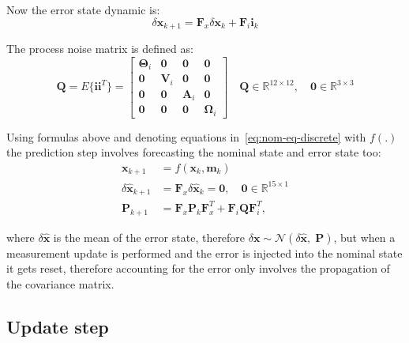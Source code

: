 Now the error state dynamic is:
\begin{equation}
    \delta\mathbf{x}_{k+1}=\mathbf{F}_x\delta\mathbf{x}_k+\mathbf{F}_{i}\mathbf{i}_k
    \label{eq:error-state-dyn}
\end{equation}

The process noise matrix is defined as:
\begin{equation}
    \mathbf{Q}=E\{\mathbf{i}\mathbf{i}^T\}=\begin{bmatrix}
        \boldsymbol{\Theta}_i & \mathbf{0} & \mathbf{0} & \mathbf{0} \\
        \mathbf{0} & \mathbf{V}_i & \mathbf{0} & \mathbf{0} \\
        \mathbf{0} & \mathbf{0} & \mathbf{A}_i & \mathbf{0} \\
        \mathbf{0} & \mathbf{0} & \mathbf{0} & \boldsymbol{\Omega}_i
    \end{bmatrix} \quad \mathbf{Q}\in\mathbb{R}^{12\times 12},\quad \mathbf{0}\in\mathbb{R}^{3\times 3}
\end{equation}

Using formulas above and denoting equations in~\eqref{eq:nom-eq-discrete} with $f(.)$ the prediction step involves forecasting the nominal state and error state too:
\begin{subequations}
\begin{align}
    \mathbf{x}_{k+1} &= f(\mathbf{x}_k, \mathbf{m}_k) \\
    \delta\hat{\mathbf{x}}_{k+1} &= \mathbf{F}_x\delta\hat{\mathbf{x}}_k=\mathbf{0}, \quad \mathbf{0}\in\mathbb{R}^{15\times 1} \label{eq:err-state-dyn}\\
    \mathbf{P}_{k+1} &= \mathbf{F}_x\mathbf{P}_k\mathbf{F}_x^T+ \mathbf{F}_i\mathbf{Q}\mathbf{F}_i^T,
    \label{eq:err-cov-prop}
\end{align}
\end{subequations}

where $\delta\hat{\mathbf{x}}$ is the mean of the error state, therefore $\delta\mathbf{x}\sim\mathcal{N}(\delta\hat{\mathbf{x}},\;\mathbf{P})$, but when a measurement update is performed and the error is injected into the nominal state it gets reset, therefore accounting for the error only involves the propagation of the covariance matrix.

\subsection{Update step}

